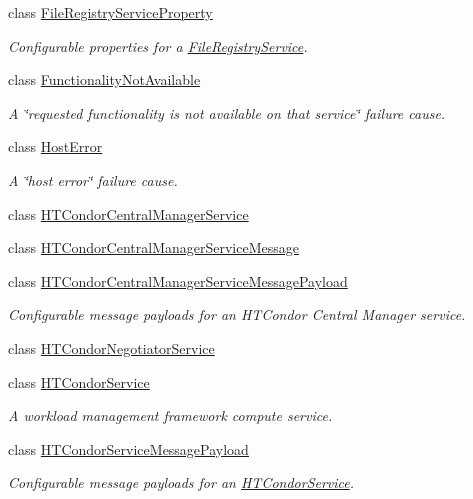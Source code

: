 \begin{DoxyCompactItemize}
class \hyperlink{classwrench_1_1_file_registry_service_property}{File\+Registry\+Service\+Property}
\begin{DoxyCompactList}\small\item\em Configurable properties for a \hyperlink{classwrench_1_1_file_registry_service}{File\+Registry\+Service}. \end{DoxyCompactList}\item 
class \hyperlink{classwrench_1_1_functionality_not_available}{Functionality\+Not\+Available}
\begin{DoxyCompactList}\small\item\em A \char`\"{}requested functionality is not available on that service\char`\"{} failure cause. \end{DoxyCompactList}\item 
class \hyperlink{classwrench_1_1_host_error}{Host\+Error}
\begin{DoxyCompactList}\small\item\em A \char`\"{}host error\char`\"{} failure cause. \end{DoxyCompactList}\item 
class \hyperlink{classwrench_1_1_h_t_condor_central_manager_service}{H\+T\+Condor\+Central\+Manager\+Service}
\item 
class \hyperlink{classwrench_1_1_h_t_condor_central_manager_service_message}{H\+T\+Condor\+Central\+Manager\+Service\+Message}
\item 
class \hyperlink{classwrench_1_1_h_t_condor_central_manager_service_message_payload}{H\+T\+Condor\+Central\+Manager\+Service\+Message\+Payload}
\begin{DoxyCompactList}\small\item\em Configurable message payloads for an H\+T\+Condor Central Manager service. \end{DoxyCompactList}\item 
class \hyperlink{classwrench_1_1_h_t_condor_negotiator_service}{H\+T\+Condor\+Negotiator\+Service}
\item 
class \hyperlink{classwrench_1_1_h_t_condor_service}{H\+T\+Condor\+Service}
\begin{DoxyCompactList}\small\item\em A workload management framework compute service. \end{DoxyCompactList}\item 
class \hyperlink{classwrench_1_1_h_t_condor_service_message_payload}{H\+T\+Condor\+Service\+Message\+Payload}
\begin{DoxyCompactList}\small\item\em Configurable message payloads for an \hyperlink{classwrench_1_1_h_t_condor_service}{H\+T\+Condor\+Service}. \end{DoxyCompactList}\item 

\end{DoxyCompactItemize}
